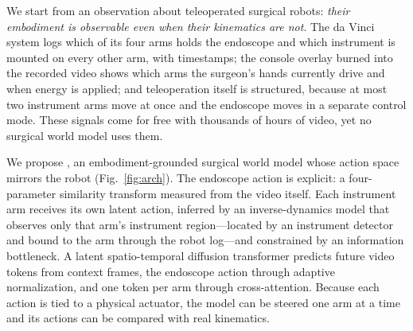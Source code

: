 We start from an observation about teleoperated surgical robots: \emph{their embodiment is observable even when their kinematics are not}. The da Vinci system logs which of its four arms holds the endoscope and which instrument is mounted on every other arm, with timestamps; the console overlay burned into the recorded video shows which arms the surgeon's hands currently drive and when energy is applied; and teleoperation itself is structured, because at most two instrument arms move at once and the endoscope moves in a separate control mode. These signals come for free with thousands of hours of video, yet no surgical world model uses them.

We propose \method{}, an embodiment-grounded surgical world model whose action space mirrors the robot (Fig.~\ref{fig:arch}). The endoscope action is explicit: a four-parameter similarity transform measured from the video itself. Each instrument arm receives its own latent action, inferred by an inverse-dynamics model that observes only that arm's instrument region---located by an instrument detector and bound to the arm through the robot log---and constrained by an information bottleneck. A latent spatio-temporal diffusion transformer predicts future video tokens from context frames, the endoscope action through adaptive normalization, and one token per arm through cross-attention. Because each action is tied to a physical actuator, the model can be steered one arm at a time and its actions can be compared with real kinematics.

